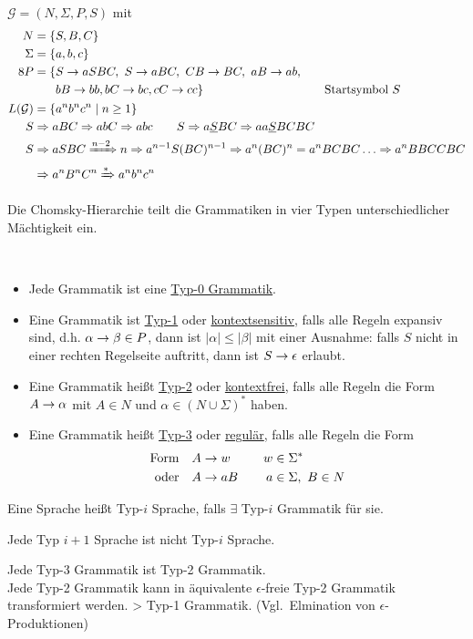 \begin{Bsp} $\mathcal{G}=(N,\Sigma,P,S)$ mit
	\begin{align*}
		N &= \{S,B,C\}\\
		\Sigma &= \{a,b,c\}\\8
		P &= 
		\begin{aligned}[t]
			 \{ &S \-> aSBC,\ S\->aBC,\ CB\-> BC,\ aB\-> ab,\\
			 &bB\-> bb, bC\-> bc, cC\-> cc \} & \quad\text{Startsymbol }S
		\end{aligned}\\
		L(\mathcal{G}) &=  \{ a^nb^nc^n \mid n\geq 1 \}\\
		S &\=> aBC \=> abC \=> abc \qquad S\=>a\underline{S}BC \=> aa\underline{S}BCBC\\
		S &\=> aSBC \xRightarrow{n-2} n \=> a^{n-1}S(BC)^{n-1} \=> a^n(BC)^n = a^nBCBC \dots \=> a^nBBCCBC\\
		&\=> a^nB^nC^n \xRightarrow* a^nb^nc^n
	\end{align*}
\end{Bsp}
Die Chomsky-Hierarchie teilt die Grammatiken in vier Typen unterschiedlicher Mächtigkeit ein.
\begin{Def}\
	\begin{itemize}
	\item Jede Grammatik ist eine \underline{Typ-0 Grammatik}.
	\item Eine Grammatik ist \underline{Typ-1} oder \underline{kontextsensitiv}, falls alle Regeln expansiv sind, d.h. $\alpha\->\beta\in P$, dann ist $|\alpha|\leq |\beta|$ mit einer Ausnahme: falls $S$ nicht in einer rechten Regelseite auftritt, dann ist $S\->\epsilon$ erlaubt.
	\item Eine Grammatik heißt \underline{Typ-2} oder \underline{kontextfrei}, falls alle Regeln die Form $A\->\alpha$ mit $A\in N$ und $\alpha\in(N\cup\Sigma)^*$ haben.
	\item Eine Grammatik heißt \uline{Typ-3} oder \uline{regulär}, falls alle Regeln die Form
	\begin{alignat*}{2}
		\text{Form}\quad &A\->w &\quad w&\in\Sigma^*\\
		\text{oder}\quad &A\->aB& a&\in\Sigma,\ B\in N
	\end{alignat*}
	\end{itemize}
	Eine Sprache heißt Typ-$i$ Sprache, falls $\exists$ Typ-$i$ Grammatik für sie.
\end{Def}

\begin{Beobachtung}
	Jede Typ $i+1$ Sprache ist nicht Typ-$i$ Sprache.
\end{Beobachtung}
Jede Typ-3 Grammatik ist Typ-2 Grammatik.\\
Jede Typ-2 Grammatik kann in äquivalente $\epsilon$-freie Typ-2 Grammatik transformiert werden. \-> Typ-1 Grammatik. (Vgl.\ Elmination von $\epsilon$-Produktionen)

